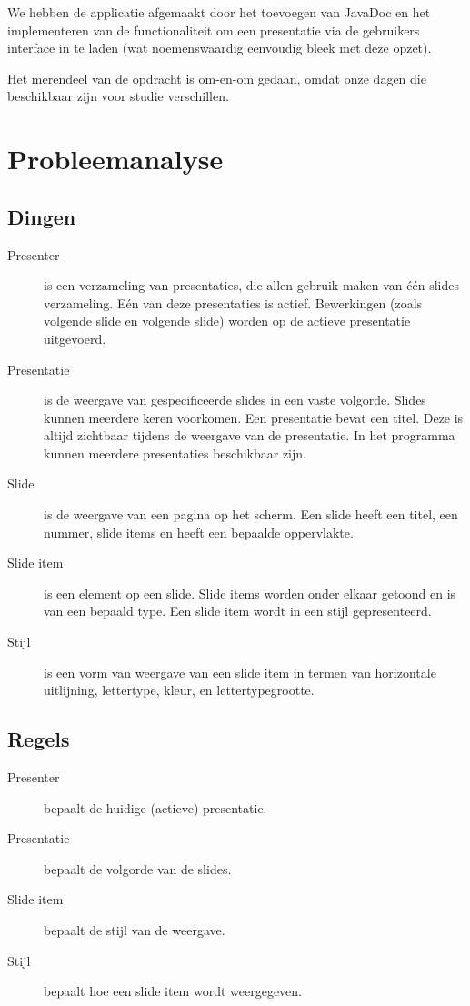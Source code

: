 \documentclass[a4paper]{article}
\begin{document}
\par
We hebben de applicatie afgemaakt door het toevoegen van JavaDoc en het implementeren van de functionaliteit om een presentatie via de gebruikers interface in te laden (wat noemenswaardig eenvoudig bleek met deze opzet).
\par
Het merendeel van de opdracht is om-en-om gedaan, omdat onze dagen die beschikbaar zijn voor studie verschillen.

\section{Probleemanalyse}
\subsection{Dingen}
\begin{description}
\item[Presenter] is een verzameling van presentaties, die allen gebruik maken van \'e\'en slides verzameling. E\'en van deze presentaties is actief. Bewerkingen (zoals volgende slide en volgende slide) worden op de actieve presentatie uitgevoerd.
\item[Presentatie] is de weergave van gespecificeerde slides in een vaste volgorde. Slides kunnen meerdere keren voorkomen. Een presentatie bevat een titel. Deze is altijd zichtbaar tijdens de weergave van de presentatie. In het programma kunnen meerdere presentaties beschikbaar zijn.
\item[Slide] is de weergave van een pagina op het scherm. Een slide heeft een titel, een nummer, slide items en heeft een bepaalde oppervlakte.
\item[Slide item] is een element op een slide. Slide items worden onder elkaar getoond en is van een bepaald type.
Een slide item wordt in een stijl gepresenteerd.
\item[Stijl] is een vorm van weergave van een slide item in termen van horizontale uitlijning, lettertype, kleur, en lettertypegrootte.
\end{description}

\subsection{Regels}
\begin{description}
\item[Presenter] bepaalt de huidige (actieve) presentatie.
\item[Presentatie] bepaalt de volgorde van de slides.
\item[Slide item] bepaalt de stijl van de weergave.
\item[Stijl] bepaalt hoe een slide item wordt weergegeven. 
\end{description}
\end{document}
